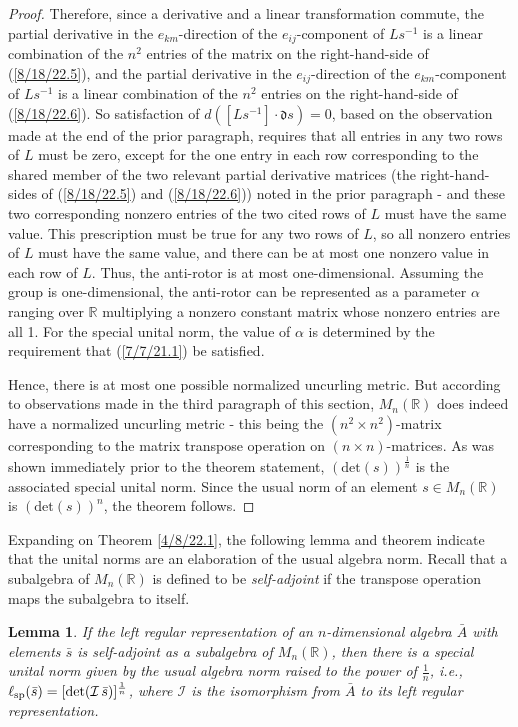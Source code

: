 \documentclass{amsart}
\numberwithin{equation}{section}
\newtheorem{lemma}[theorem]{Lemma}
\theoremstyle{definition}
\numberwithin{theorem}{section}
\begin{document}
\begin{proof}
Therefore, since a derivative and a linear transformation commute, the partial derivative in the $e_{km}$-direction of the $e_{ij}$-component of $Ls^{-1}$ is a linear combination of the $n^2$ entries of the matrix on the right-hand-side of (\ref{8/18/22.5}), and  the partial derivative in the $e_{ij}$-direction of the $e_{km}$-component of $Ls^{-1}$ is a linear combination of the $n^2$ entries on the right-hand-side of (\ref{8/18/22.6}).
So satisfaction of \mbox{$d\left([Ls^{-1}]\cdot \mathfrak{d}s\right) = 0$,} based on the observation made at the end of the prior paragraph, requires that all entries in any two rows of $L$ must be zero, except for the one entry in each row corresponding to the shared member of the two relevant partial derivative matrices (the right-hand-sides of (\ref{8/18/22.5}) and (\ref{8/18/22.6})) noted in the prior paragraph - and these two corresponding nonzero entries of the two cited rows of $L$ must have the same value.  This prescription must be true for any two rows of $L$, so all nonzero entries of $L$ must have the same value, and there can be at most one nonzero value in each row of $L$.  Thus, the anti-rotor is at most one-dimensional. Assuming the group is one-dimensional, the anti-rotor can be represented as a parameter $\alpha$ ranging over $\mathbb{R}$ multiplying a nonzero constant matrix whose nonzero entries are all 1.  
For the special unital norm, the value of $\alpha$ is determined by the requirement that (\ref{7/7/21.1}) be satisfied. 


Hence, there is at most one possible normalized uncurling metric.  But according to observations made in the third paragraph of this section, $ M_n(\mathbb{R})$ does indeed have a normalized uncurling metric - this being the $(n^2\times n^2)$-matrix corresponding to the matrix transpose operation on $(n\times n)$-matrices.  As was shown immediately prior to the theorem statement, $(\mbox{det}(s))^{\frac{1}{n}}$ is the associated special unital norm.  Since the usual norm of an element $s\in M_n(\mathbb{R})$ is $(\mbox{det}(s))^n$, the theorem follows.
 \end{proof}
 
 Expanding on Theorem \ref{4/8/22.1}, the following lemma and theorem indicate that the unital norms are an elaboration of the usual algebra norm.  Recall that a subalgebra of $M_n(\mathbb{R})$ is defined to be {\it self-adjoint} if the transpose operation maps the subalgebra to itself.
 
  \begin{lemma}\label{5/13/22.1} If the left regular representation of an $n$-dimensional algebra $\bar{A}$ with elements $\bar{s}$ is self-adjoint as a subalgebra of $M_n(\mathbb{R})$, then there is a special unital norm given by the usual algebra norm raised to the power of $\frac{1}{n}$, i.e., $\ell_{\rm sp}(\bar{s}) = [{\rm det}(\mathcal{I}\, \bar{s})]^\frac{1}{n}$, where $\mathcal{I}$ is the isomorphism from $\bar{A}$ to its left regular representation.
\end{lemma}
\end{document}
